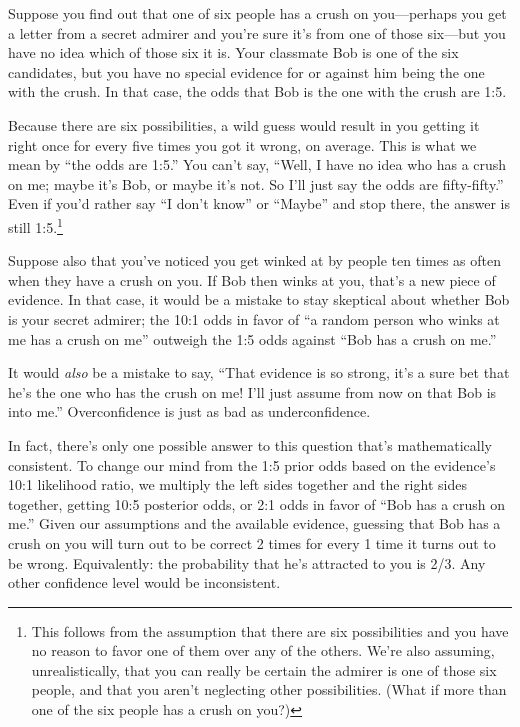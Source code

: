 {
 Suppose you find out that one of six people has a crush on
you---perhaps you get a letter from a secret admirer and
you're sure it's from one of those
six---but you have no idea which of those six it is. Your classmate Bob
is one of the six candidates, but you have no special evidence for or
against him being the one with the crush. In that case, the odds that
Bob is the one with the crush are 1:5.}

{
 Because there are six possibilities, a wild guess would result in
you getting it right once for every five times you got it wrong, on
average. This is what we mean by ``the odds are
1:5.'' You can't say,
``Well, I have no idea who has a crush on me; maybe
it's Bob, or maybe it's not. So
I'll just say the odds are
fifty-fifty.'' Even if you'd rather
say ``I don't know''
or ``Maybe'' and stop there, the
answer is still 1:5.\footnote{This follows from the assumption that there are six
possibilities and you have no reason to favor one of them over any of
the others. We're also assuming, unrealistically, that
you can really be certain the admirer is one of those six people, and
that you aren't neglecting other possibilities. (What
if more than one of the six people has a crush on you?)}}

{
 Suppose also that you've noticed you get winked at
by people ten times as often when they have a crush on you. If Bob then
winks at you, that's a new piece of evidence. In that
case, it would be a mistake to stay skeptical about whether Bob is your
secret admirer; the 10:1 odds in favor of ``a random
person who winks at me has a crush on me'' outweigh
the 1:5 odds against ``Bob has a crush on
me.''}

{
 It would \textit{also} be a mistake to say,
``That evidence is so strong, it's a
sure bet that he's the one who has the crush on me!
I'll just assume from now on that Bob is into
me.'' Overconfidence is just as bad as
underconfidence.}

{
 In fact, there's only one possible answer to this
question that's mathematically consistent. To change
our mind from the 1:5 prior odds based on the
evidence's 10:1 likelihood ratio, we multiply the left
sides together and the right sides together, getting 10:5 posterior
odds, or 2:1 odds in favor of ``Bob has a crush on
me.'' Given our assumptions and the available
evidence, guessing that Bob has a crush on you will turn out to be
correct 2 times for every 1 time it turns out to be wrong.
Equivalently: the probability that he's attracted to
you is 2/3. Any other confidence level would be inconsistent.}

